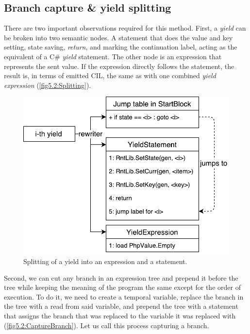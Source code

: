 \subsection{Branch capture \& yield splitting}\label{Capture}

There are two important observations required for this method. First, a \emph{yield} can be broken into two semantic nodes. A statement that does the value and key setting, state saving, \emph{return}, and marking the continuation label, acting as the equivalent of a C\# \emph{yield} statement. The other node is an expression that represents the sent value. If the expression directly follows the statement, the result is, in terms of emitted CIL, the same as with one combined \emph{yield expression} (\autoref{fig5.2:Splitting}). 


\begin{figure}[h]
	\centering	
	\includegraphics[scale=0.75]{../img/5_2_yieldSplitting}	
	\caption{Splitting of a yield into an expression and a statement.}
	\label{fig5.2:Splitting}
\end{figure}

Second, we can cut any branch in an expression tree and prepend it before the tree while keeping the meaning of the program the same except for the order of execution. To do it, we need to create a temporal variable, replace the branch in the tree with a read from said variable, and prepend the tree with a statement that assigns the branch that was replaced to the variable it was replaced with (\autoref{fig5.2:CaptureBranch}). Let us call this process capturing a branch.

